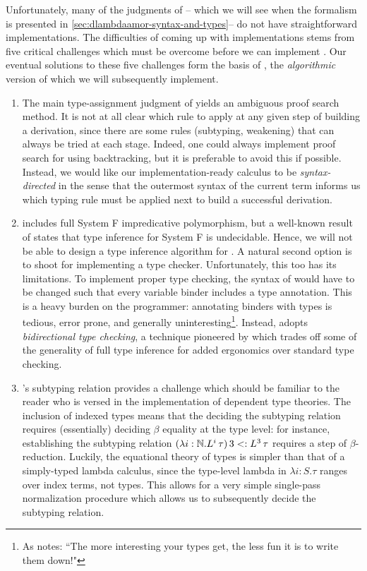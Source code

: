 Unfortunately, many of the judgments of \dlambdaamor -- which we will see when the formalism is presented in \autoref{sec:dlambdaamor-syntax-and-types}-- do not have straightforward implementations. The difficulties of coming up with implementations stems from five critical challenges which must be overcome before we can implement \dlambdaamor. Our eventual solutions to these five challenges form the basis of \bilambdaamor, the \textit{algorithmic} version of \dlambdaamor which we will subsequently implement.

\begin{enumerate}
  \item The main type-assignment judgment of \dlambdaamor yields an ambiguous proof search method. It is not at all clear which rule to apply at any given step of building a derivation, since there are some rules (subtyping, weakening) that can always be tried at each stage. Indeed, one could always implement proof search for \dlambdaamor using backtracking, but it is preferable to avoid this if possible. Instead, we would like our implementation-ready calculus \bilambdaamor to be \textit{syntax-directed} in the sense that the outermost syntax of the current term informs us which typing rule must be applied next to build a successful derivation. 
  
  \item \dlambdaamor includes full System F impredicative polymorphism, but a well-known result of \citet{wells:pal91} states that type inference for System F is undecidable. Hence, we will not be able to design a type inference algorithm for \dlambdaamor. A natural second option is to shoot for implementing a type checker. Unfortunately, this too has its limitations. To implement proper type checking, the syntax of \dlambdaamor would have to be changed such that every variable binder includes a type annotation. This is a heavy burden on the programmer: annotating binders with types is tedious, error prone, and generally uninteresting\footnote{
As \citet{pierce:lics03} notes: ``The more interesting your types get, the less fun it is to write them down!"
  }. Instead, \bilambdaamor adopts \textit{bidirectional type checking}, a technique pioneered by \cite{pierce-and-turner:lti} which trades off some of the generality of full type inference for added ergonomics over standard type checking.
  
  \item \dlambdaamor's subtyping relation provides a challenge which should be familiar to the reader who is versed in the implementation of dependent type theories. The inclusion of indexed types means that the deciding the subtyping relation requires (essentially) deciding $\beta$ equality at the type level: for instance, establishing the subtyping relation $(\lambda i : \mathbb{N}. L^i\, \tau) \, 3 <: L^3 \, \tau$ requires a step of $\beta$-reduction. Luckily, the equational theory of types is simpler than that of a simply-typed lambda calculus, since the type-level lambda in \dlambdaamor $\lambda i : S. \tau$ ranges over index terms, not types. This allows for a very simple single-pass normalization procedure which allows us to subsequently decide the subtyping relation.
  

\end{enumerate}
